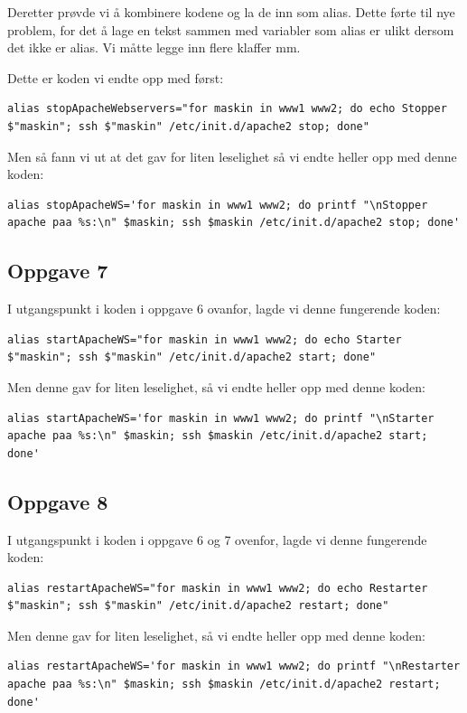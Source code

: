\documentclass[a4paper, norsk, 12pt]{article}
\begin{document}
Deretter prøvde vi å kombinere kodene og la de inn som alias. Dette førte til nye problem, for det å lage en tekst sammen med variabler som alias er ulikt dersom det ikke er alias. Vi måtte legge inn flere klaffer mm.

Dette er koden vi endte opp med først:
\begin{verbatim}
alias stopApacheWebservers="for maskin in www1 www2; do echo Stopper $"maskin"; ssh $"maskin" /etc/init.d/apache2 stop; done"
\end{verbatim}

Men så fann vi ut at det gav for liten leselighet så vi endte heller opp med denne koden:
\begin{verbatim}
alias stopApacheWS='for maskin in www1 www2; do printf "\nStopper apache paa %s:\n" $maskin; ssh $maskin /etc/init.d/apache2 stop; done'
\end{verbatim}

\subsection{Oppgave 7}
I utgangspunkt i koden i oppgave 6 ovanfor, lagde vi denne fungerende koden:
\begin{verbatim}
alias startApacheWS="for maskin in www1 www2; do echo Starter $"maskin"; ssh $"maskin" /etc/init.d/apache2 start; done"
\end{verbatim}

Men denne gav for liten leselighet, så vi endte heller opp med denne koden:
\begin{verbatim}
alias startApacheWS='for maskin in www1 www2; do printf "\nStarter apache paa %s:\n" $maskin; ssh $maskin /etc/init.d/apache2 start; done'
\end{verbatim}

\subsection{Oppgave 8}
I utgangspunkt i koden i oppgave 6 og 7 ovenfor, lagde vi denne fungerende koden:
\begin{verbatim}
alias restartApacheWS="for maskin in www1 www2; do echo Restarter $"maskin"; ssh $"maskin" /etc/init.d/apache2 restart; done"
\end{verbatim}

Men denne gav for liten leselighet, så vi endte heller opp med denne koden:
\begin{verbatim}
alias restartApacheWS='for maskin in www1 www2; do printf "\nRestarter apache paa %s:\n" $maskin; ssh $maskin /etc/init.d/apache2 restart; done'
\end{verbatim}
\end{document}
